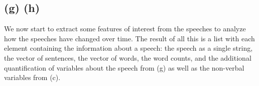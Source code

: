 \documentclass{article}
\begin{document}
\newpage



\subsection*{(g) (h)}

We now start to extract some features of interest from the speeches to analyze how the speeches have
changed over time. The result of all this is a list with each element containing the information
about a speech: the speech as a single string, the vector of sentences, the vector of words, the
word counts, and the additional quantification of variables about the speech from (g) as well as
the non-verbal variables from (c).
\end{document}
